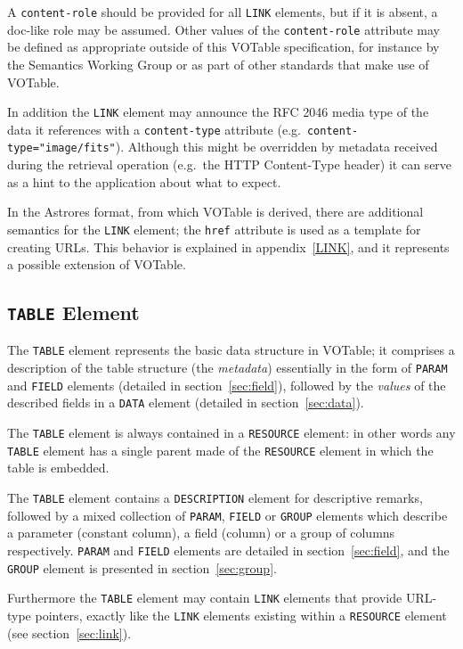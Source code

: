 \documentclass[11pt,a4paper]{ivoa}
\def\Aref#1{section~\ref{#1}}
\def\Arefx#1{appendix~\ref{#1}}
\let\fg=\color
\def\attr#1{{\tt{\fg{DarkRed}#1}}}
\def\elem#1{{\tt{\fg{DarkRed}#1}}}
\def\attrval#1#2{{\tt{\fg{DarkRed}#1}="{\fg{DarkPurple}#2}"}}
\begin{document}
A \attr{content-role} should be provided for all \elem{LINK} elements,
but if it is absent, a doc-like role may be assumed.
Other values of the \attr{content-role} attribute may be defined
as appropriate outside of this VOTable specification,
for instance by the Semantics Working Group or as part of other
standards that make use of VOTable.

In addition the \elem{LINK} element
may announce the RFC 2046 media type of the data it references
with a \attr{content-type} attribute (e.g.\ \attrval{content-type}{image/fits}).
Although this might be overridden by metadata received during the
retrieval operation (e.g.\ the HTTP Content-Type header)
it can serve as a hint to the application about what to expect.

In the Astrores format, from which VOTable is derived,
there are additional semantics for the {\elem{LINK}}
element; the \elem{href} attribute is used as a template for creating
URLs. This behavior is explained in \Arefx{LINK},
and it represents
a possible extension of VOTable.

\subsection{\elem{TABLE} Element}
\label{elem:TABLE}

The \elem{TABLE} element represents the basic data structure in VOTable;
it comprises a description of the table structure (the {\em metadata})
essentially in the form of \elem{PARAM} and \elem{FIELD} elements
(detailed in \Aref{sec:field}),
followed by the {\em values} of the described fields in a \elem{DATA}
element (detailed in \Aref{sec:data}).

The \elem{TABLE} element is always contained in a \elem{RESOURCE} element:
in other words
any \elem{TABLE} element has a single parent made of the
\elem{RESOURCE} element
in which the table is embedded.

The \elem{TABLE} element contains
a {\elem{DESCRIPTION}} element for descriptive remarks, followed
by a mixed collection of \elem{PARAM}, \elem{FIELD} or \elem{GROUP} elements
which describe a parameter (constant column), a field (column) or a group of
columns respectively. \elem{PARAM} and \elem{FIELD} elements are detailed in
\Aref{sec:field}, and the \elem{GROUP} element
is presented in \Aref{sec:group}.

Furthermore the \elem{TABLE} element may contain {\elem{LINK}} elements
that provide URL-type pointers, exactly like the {\elem{LINK}} elements
existing within a \elem{RESOURCE} element (see \Aref{sec:link}).
\end{document}
